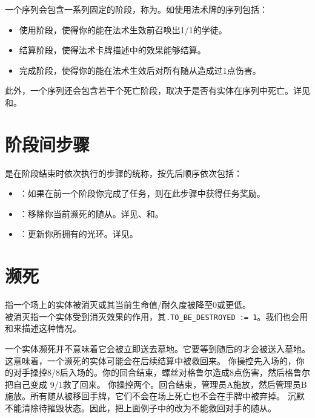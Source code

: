 一个序列会包含一系列固定的阶段，称为。如使用法术牌的序列包括：
\begin{itemize}
    \item 使用阶段，使得你的能在法术生效前召唤出1/1的学徒。
    \item 结算阶段，使得法术卡牌描述中的效果能够结算。
    \item 完成阶段，使得你的能在法术生效后对所有随从造成过1点伤害。
\end{itemize}

此外，一个序列还会包含若干个死亡阶段，取决于是否有实体在序列中死亡。详见和。

\section{阶段间步骤}

是在阶段结束时依次执行的步骤的统称，按先后顺序依次包括：
\begin{itemize}
    \item {}：如果在前一个阶段你完成了任务，则在此步骤中获得任务奖励。
    \item {}：移除你当前濒死的随从。详见、和。
    \item {}：更新你所拥有的光环。详见。
\end{itemize}

\section{濒死}
\label{dying}

指一个场上的实体被消灭或其当前生命值/耐久度被降至0或更低。\\
被消灭指一个实体受到消灭效果的作用，其\texttt{.TO\_BE\_DESTROYED := 1}。我们也会用和来描述这种情况。

\notice 一个实体濒死并不意味着它会被立即送去墓地。它要等到随后的才会被送入墓地。这意味着，一个濒死的实体可能会在后续结算中被救回来。
\example 你操控先入场的，你的对手操控8/8后入场的。你的回合结束，螺丝对格鲁尔造成8点伤害，然后格鲁尔把自己变成 9/1救了回来。
\example 你操控两个。回合结束，管理员A施放，然后管理员B施放。所有随从被移回手牌，它们不会在场上死亡也不会在手牌中被弃掉。
\notice 沉默不能清除待摧毁状态。因此，把上面例子中的改为不能救回对手的随从。

